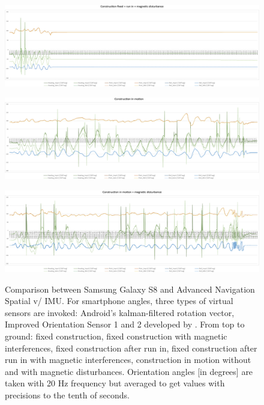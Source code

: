 \documentclass[review]{elsarticle}
\begin{document}
\begin{figure}[htbp!]
\begin{center}
		\begin{minipage}{\columnwidth} 
	 		\centering
			\subfigure
			{\includegraphics[keepaspectratio, width=1\columnwidth]{graphics/Sensor_Galaxy_run1/sensor_diagramms_galaxys8_4}\label{fig:sensor_sensi:samsung_1st:4}}
	 	\end{minipage}
	 			\begin{minipage}{\columnwidth} 
	 		\centering
			\subfigure
			{\includegraphics[keepaspectratio, width=1\columnwidth]{graphics/Sensor_Galaxy_run1/sensor_diagramms_galaxys8_5}\label{fig:sensor_sensi:samsung_1st:5}}
	 	\end{minipage}
	 			\begin{minipage}{\columnwidth} 
	 		\centering
			\subfigure
			{\includegraphics[keepaspectratio, width=1\columnwidth]{graphics/Sensor_Galaxy_run1/sensor_diagramms_galaxys8_6}\label{fig:sensor_sensi:samsung_1st:6}}
	 	\end{minipage}
	\caption{Comparison between Samsung Galaxy S8 and Advanced Navigation Spatial v/ \gls{IMU}. For smartphone angles, three types of virtual sensors are invoked: Android's kalman-filtered rotation vector, Improved Orientation Sensor 1 and 2 developed by \cite{Pacha2015}. From top to ground: fixed construction, fixed construction with magnetic interferences, fixed construction after run in, fixed construction after run in with magnetic interferences, construction in motion without and with magnetic disturbances. Orientation angles [in degrees] are taken with 20 Hz frequency but averaged to get values with precisions to the tenth of seconds.}
	\label{fig:sensor_sensi:samsung_1st_b}
\end{center}
\end{figure}
\end{document}
